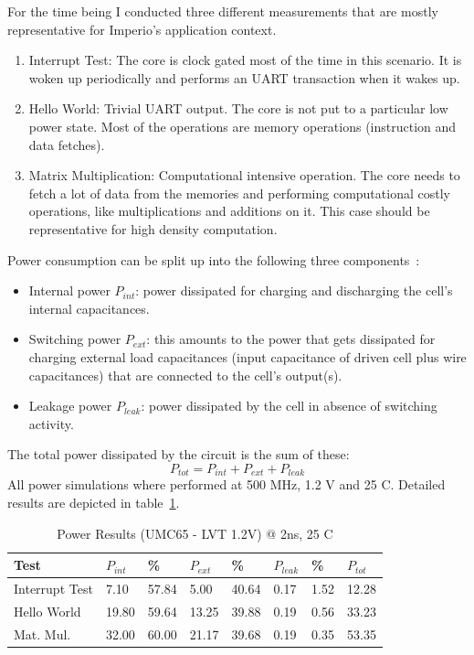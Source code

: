 For the time being I conducted three different measurements that are mostly representative for Imperio's application context.

\begin{enumerate}
    \item Interrupt Test: The core is clock gated most of the time in this scenario. It is woken up periodically and performs an UART transaction when it wakes up.
    \item Hello World: Trivial UART output. The core is not put to a particular low power state. Most of the operations are memory operations (instruction and data fetches).
    \item Matrix Multiplication: Computational intensive operation. The core needs to fetch a lot of data from the memories and performing computational costly operations, like multiplications and additions on it. This case should be representative for high density computation. 
\end{enumerate}

Power consumption can be split up into the following three components~\cite{Kaeslin08}:
\begin{itemize}
    \item Internal power $P_{int}$: power dissipated for charging and discharging the cell's internal capacitances.
    \item Switching power $P_{ext}$: this amounts to the power that gets dissipated for charging external load capacitances (input capacitance of driven cell plus wire capacitances) that are connected to the cell's output(s).
    \item Leakage power $P_{leak}$: power dissipated by the cell in absence of switching activity.
\end{itemize}
The total power dissipated by the circuit is the sum of these:
\[
    P_{tot} = P_{int} + P_{ext} + P_{leak}
\]
All power simulations where performed at 500 MHz, 1.2 V and 25 \textdegree C. Detailed results are depicted in table~\ref{tab:power}.

\begin{table}[htbp]
 \caption{Power Results (UMC65 - LVT 1.2V) @ 2ns, 25 \textdegree C}
 \label{tab:power}
\begin{tabularx}{\textwidth}{|X||l|l||l|l||l|l||l|}
  \hline
  \textbf{Test} & $P_{int}$& \% & $P_{ext}$ &  \% & $P_{leak}$ &  \% & $P_{tot}$\\ \hline
Interrupt Test & 7.10 & 57.84 & 5.00 &  40.64 & 0.17 & 1.52 & 12.28 \\ \hline
Hello World & 19.80 & 59.64 & 13.25 & 39.88 & 0.19 & 0.56 & 33.23 \\ \hline
Mat. Mul. & 32.00 & 60.00 & 21.17 & 39.68 & 0.19 & 0.35 & 53.35 \\ \hline
  \end{tabularx}
  \end{table}







